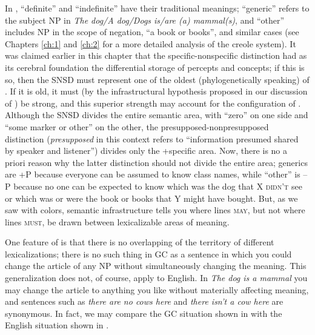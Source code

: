 

In , ``definite'' and ``indefinite'' have their traditional meanings; ``gener\-ic'' refers to the subject NP in \textit{The dog/A dog/Dogs is/are (a) mammal(s)}, and ``other'' includes NP in the scope of negation, ``a book or books'', and similar cases (see Chapters \ref{ch:1} and \ref{ch:2} for a more detailed analysis of the creole system). It was claimed earlier in this chapter that the specific-nonspecific distinction had as its cerebral foundation the differential storage of percepts and concepts; if this is so, then the SNSD must represent one of the oldest (phylogenetically speaking) of . If it is old, it must (by the infrastructural hypothesis proposed in our discussion of ) be strong, and this superior strength may account for the configuration of . Although the SNSD divides the entire semantic area, with ``zero'' on one side and ``some marker or other'' on the other, the presupposed-nonpresupposed distinction (\textit{presupposed} in this context refers to ``information presumed shared by speaker and listener'') divides only the +specific area. Now, there is no a priori reason why the latter distinction should not divide the entire area; generics are +P because everyone can be assumed to know class names, while ``other'' is --P because no one can be expected to know which was the dog that X \textsc{didn't} see or which was or were the book or books that Y might have bought. But, as we saw with colors, semantic infrastructure tells you where lines \textsc{may}, but not where lines \textsc{must}, be drawn between lexicalizable areas of meaning.

One feature of  is that there is no overlapping of the territory of different lexicalizations; there is no such thing in GC as a sentence in which you could change the article of any NP without simultaneously changing the meaning. This generalization does not, of course, apply to English. In \textit{The dog is a mammal} you may change the article to anything you like without materially affecting meaning, and sentences such as \textit{there are no cows here} and \textit{there isn't a cow here} are synonymous. In fact, we may compare the GC situation shown in  with the English situation shown in . %

